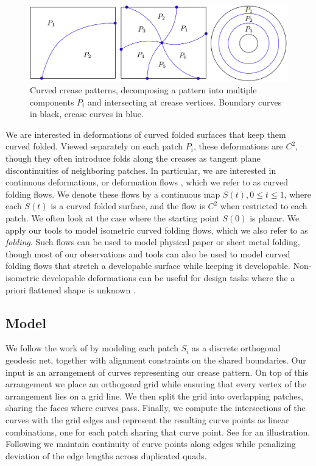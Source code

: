 \begin{figure} [t]
	\centering
	\includegraphics[width=\linewidth]{figures/crease_patterns}
	\caption{Curved crease patterns, decomposing a pattern into multiple components $P_i$ and intersecting at crease vertices. Boundary curves in black, crease curves in blue.}
	\label{fig:crease_pattern}
\end{figure}

We are interested in deformations of curved folded surfaces that keep them curved folded. Viewed separately on each patch $P_i$, these deformations are $C^2$, though they often introduce folds along the creases as tangent plane discontinuities of neighboring patches. In particular, we are interested in continuous deformations, or deformation flows \cite{rabi2018shape}, which we refer to as curved folding flows. We denote these flows by a continuous map $S(t), 0 \leq t \leq 1$, where each $S(t)$ is a curved folded surface, and the flow is $C^2$ when restricted to each patch. We often look at the case where the starting point $S(0)$ is planar. We apply our tools to model isometric curved folding flows, which we also refer to as \emph{folding}. Such flows can be used to model physical paper or sheet metal folding, though most of our observations and tools can also be used to model curved folding flows that stretch a developable surface while keeping it developable. Non-isometric developable deformations can be useful for design tasks where the a priori flattened shape is unknown \cite{rabi18,rabi2018shape,pottmann_new}.

\subsection{Model} \label{sec:model}
We follow the work of \cite{rabi2018shape} by modeling each patch $S_i$ as a discrete orthogonal geodesic net, together with alignment constraints on the shared boundaries. Our input is an arrangement of curves representing our crease pattern. On top of this arrangement we place an orthogonal grid while ensuring that every vertex of the arrangement lies on a grid line. We then split the grid into overlapping patches, sharing the faces where curves pass. Finally, we compute the intersections of the curves with the grid edges and represent the resulting curve points as linear combinations, one for each patch sharing that curve point. See  for an illustration. Following \cite{rabi18} we maintain continuity of curve points along edges while penalizing deviation of the edge lengths across duplicated quads. 

